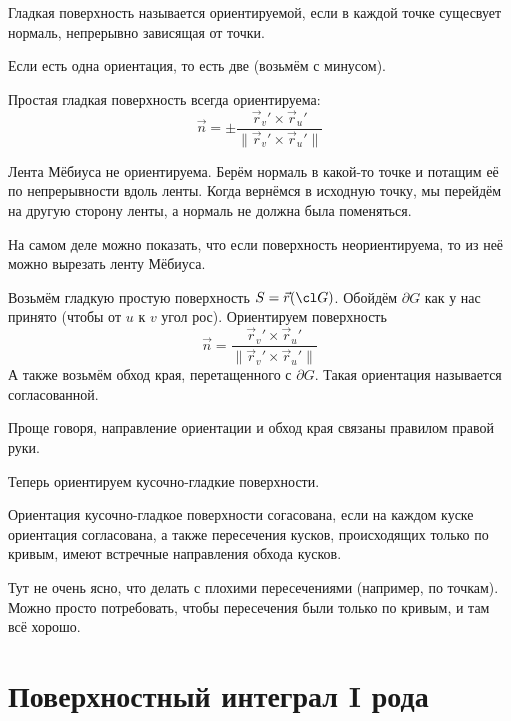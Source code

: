 \begin{Def}
	Гладкая поверхность называется ориентируемой, если в каждой точке сущесвует нормаль, непрерывно зависящая от точки.
\end{Def}

\begin{Rem}
	Если есть одна ориентация, то есть две (возьмём с минусом).
\end{Rem}

\begin{Rem}
	Простая гладкая поверхность всегда ориентируема:
	\[ \vec n = \pm \frac{\vec r_v' \times \vec r_u'}{\|\vec r_v' \times \vec r_u'\|} \]
\end{Rem}

\begin{Rem}
	Лента Мёбиуса не ориентируема.
	Берём нормаль в какой-то точке и потащим её по непрерывности вдоль ленты.
	Когда вернёмся в исходную точку, мы перейдём на другую сторону ленты, а нормаль не должна была поменяться.

	На самом деле можно показать, что если поверхность неориентируема, то из неё можно вырезать ленту Мёбиуса.
\end{Rem}

\begin{Def}
	Возьмём гладкую простую поверхность $S = \vec r(\cl G)$.
	Обойдём $\partial G$ как у нас принято (чтобы от $u$ к $v$ угол рос).
	Ориентируем поверхность
	\[ \vec n = \frac{\vec r_v' \times \vec r_u'}{\|\vec r_v' \times \vec r_u'\|} \]
	А также возьмём обход края, перетащенного с $\partial G$.
	Такая ориентация называется согласованной.

	Проще говоря, направление ориентации и обход края связаны правилом правой руки.
\end{Def}

Теперь ориентируем кусочно-гладкие поверхности.

\begin{Def}
	Ориентация кусочно-гладкое поверхности согасована, если на каждом куске ориентация согласована,
	а также пересечения кусков, происходящих только по кривым, имеют встречные направления обхода кусков.
\end{Def}

Тут не очень ясно, что делать с плохими пересечениями (например, по точкам).
Можно просто потребовать, чтобы пересечения были только по кривым, и там всё хорошо.

\section{Поверхностный интеграл I рода}

